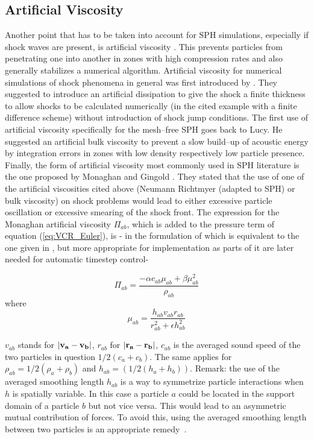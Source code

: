 \documentclass{report}
\begin{document}
\subsection{Artificial Viscosity}
\label{sec:ArtVisc}

Another point that has to be taken into account for SPH simulations, especially
if shock waves are present, is artificial viscosity \cite{Monaghan2005}. This
prevents particles from penetrating one into another in zones with high
compression rates and also generally stabilizes a numerical
algorithm.
Artificial viscosity for numerical simulations of shock phenomena
in general was first introduced by \cite{vonNeumann1950}. They suggested to
introduce an artificial dissipation to give the shock a finite thickness to 
allow shocks to be calculated numerically (in the cited example with a finite difference
scheme) without introduction of shock jump conditions.
The first use of artificial viscosity specifically for the mesh--free SPH goes
back to Lucy\cite{Lucy1977}. He suggested an artificial bulk viscosity to
prevent a slow build--up of acoustic energy by integration errors in zones with
low density respectively low particle presence. 
Finally, the form of artificial viscosity most commonly used in SPH
literature \cite{Liu2003} is the one proposed by Monaghan and
Gingold \cite{Monaghan1983}. They stated that the use of one of the artificial
viscosities cited above (Neumann Richtmyer (adapted to SPH) or bulk
viscosity) on shock problems would lead to either excessive particle
oscillation or excessive smearing of the shock front. The expression for the Monaghan
artificial viscosity $\Pi_{ab}$, which is added to the pressure term of
equation (\ref{eq:VCR_Euler}), is - in the formulation of \cite{Monaghan1992} which is equivalent to the one given in \cite{Monaghan2005}, but more appropriate for implementation as parts of it are later needed for automatic timestep control-

\begin{equation}
\label{eq:MonArtVis}
\Pi_{\mathit{ab}}= \frac{-\alpha c_{\mathit{ab}}\mu_{ab}+\beta \mu_{ab}^2}{\rho_{ab}}
\end{equation}
where 
\begin{equation}
\label{eq:FactArtVis}
\mu_{ab}=\frac{h_{ab}v_{ab}r_{ab}}{r_{ab}^2+\epsilon h_{ab}^2}
\end{equation}

$v_{ab}$ stands for $|{\bf v_a}-{\bf v_b}|$, $r_{ab}$ for $|{\bf r_a}-{\bf r_b}|$, $c_{ab}$ is the
averaged sound speed of the two particles in question $1/2(c_a+c_b)$. The same
applies for $\rho_{ab}=1/2(\rho_a+\rho_b)$ and $h_{ab}=(1/2(h_a+h_b))$. 
Remark: the use of
the averaged smoothing length $h_{ab}$ is a way to symmetrize particle
interactions when $h$ is spatially variable. In this case a particle $a$ could be
located in the support domain of a particle $b$ but not vice versa. This would
lead to an asymmetric mutual contribution of forces. To avoid this, using the
averaged smoothing length between two particles is an appropriate remedy~\cite{Liu2003}.
\end{document}
